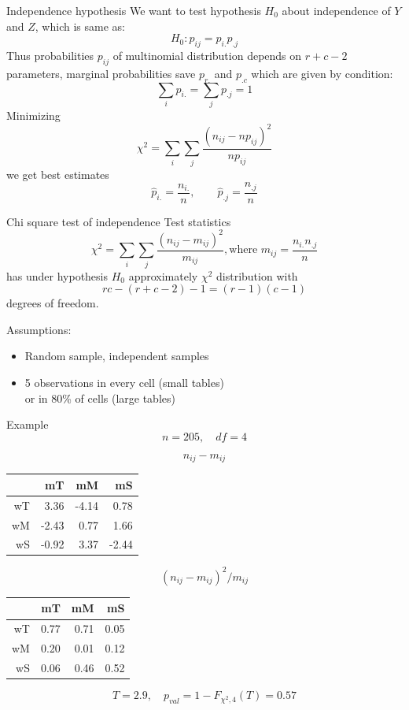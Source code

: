 \documentclass[smaller]{beamer}
\def\xskip{{\vspace{2ex}}}
\begin{document}
\begin{frame}{Independence hypothesis}
We want to test hypothesis $H_0$ about independence of $Y$ and $Z$, which is same as:
\[
  H_0: p_{ij}=p_{i.}p_{.j}
\]
Thus probabilities $p_{ij}$ of multinomial distribution depends on $r+c-2$ parameters,
marginal probabilities save $p_{r.}$ and $p_{.c}$ which are given by condition:
\[
   \sum_i p_{i.} = \sum_j p_{.j} = 1
\]
Minimizing 
\[
  \chi^2 = \sum_i \sum_j \frac{ (n_{ij} - np_{ij})^2 }{np_{ij}}
\]
we get best estimates
\[
   \hat{p}_{i.} = \frac{n_{i.}}{n}, \qquad \hat{p}_{.j}=\frac{n_{.j}}{n}
\]

\end{frame}

\begin{frame}{Chi square test of independence}
Test statistics
\[
  \chi^2 = \sum_i \sum_j \frac{ (n_{ij} - m_{ij})^2 }{m_{ij}}, \text{where } m_{ij}=\frac{n_{i.}n_{.j}}{n}
\]
has under hypothesis $H_0$ approximately $\chi^2$ distribution  with 
\[
   rc-(r+c-2)-1 =  (r-1)(c-1)
\]
degrees of freedom.

\xskip
Assumptions:
\begin{itemize}
 \item Random sample, independent samples
 \item 5 observations in every cell (small tables)\\
 or in 80\% of cells (large tables)
\end{itemize}

\end{frame}

\begin{frame}{Example}
\[
  n=205,\quad df=4
\]

\begin{multicols}{2}
\[n_{ij} - m_{ij}\] 
\begin{tabular}{r|rrr}
 & mT & mM & mS \\
\hline 
wT & 3.36 & -4.14 &  0.78 \\
wM & -2.43 & 0.77 & 1.66 \\
wS & -0.92 & 3.37 & -2.44 
\end{tabular}

\[(n_{ij} - m_{ij})^2/m_{ij}\]
\begin{tabular}{r|rrr}
 & mT & mM & mS \\
\hline 
  wT &0.77 &0.71 &0.05\\
  wM &0.20 &0.01 &0.12\\
  wS &0.06 &0.46 &0.52
\end{tabular}
\end{multicols}
\[
    T=2.9,\quad p_{val}=1-F_{\chi^2,4}(T)=0.57
\]
\end{frame}
\end{document}
